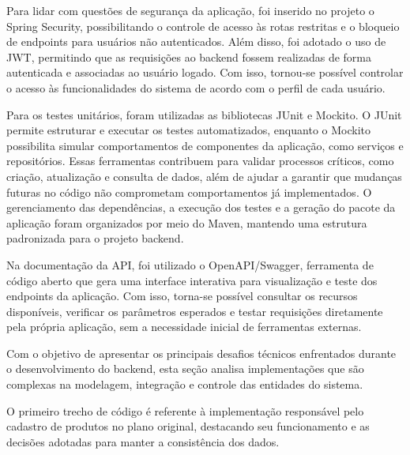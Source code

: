 Para lidar com questões de segurança da aplicação, foi inserido no projeto o Spring Security, possibilitando o controle de acesso às rotas restritas e o bloqueio de endpoints para usuários não autenticados. Além disso, foi adotado o uso de JWT, permitindo que as requisições ao backend fossem realizadas de forma autenticada e associadas ao usuário logado. Com isso, tornou-se possível controlar o acesso às funcionalidades do sistema de acordo com o perfil de cada usuário.

Para os testes unitários, foram utilizadas as bibliotecas JUnit e Mockito. O JUnit permite estruturar e executar os testes automatizados, enquanto o Mockito possibilita simular comportamentos de componentes da aplicação, como serviços e repositórios. Essas ferramentas contribuem para validar processos críticos, como criação, atualização e consulta de dados, além de ajudar a garantir que mudanças futuras no código não comprometam comportamentos já implementados. O gerenciamento das dependências, a execução dos testes e a geração do pacote da aplicação foram organizados por meio do Maven, mantendo uma estrutura padronizada para o projeto backend.

Na documentação da API, foi utilizado o OpenAPI/Swagger, ferramenta de código aberto que gera uma interface interativa para visualização e teste dos endpoints da aplicação. Com isso, torna-se possível consultar os recursos disponíveis, verificar os parâmetros esperados e testar requisições diretamente pela própria aplicação, sem a necessidade inicial de ferramentas externas.


Com o objetivo de apresentar os principais desafios técnicos enfrentados durante o desenvolvimento do backend, esta seção analisa implementações que são complexas na  modelagem, integração e controle das entidades do sistema. 

O primeiro trecho de código é referente à implementação responsável pelo cadastro de produtos no plano original, destacando seu funcionamento e as decisões adotadas para manter a consistência dos dados. 

